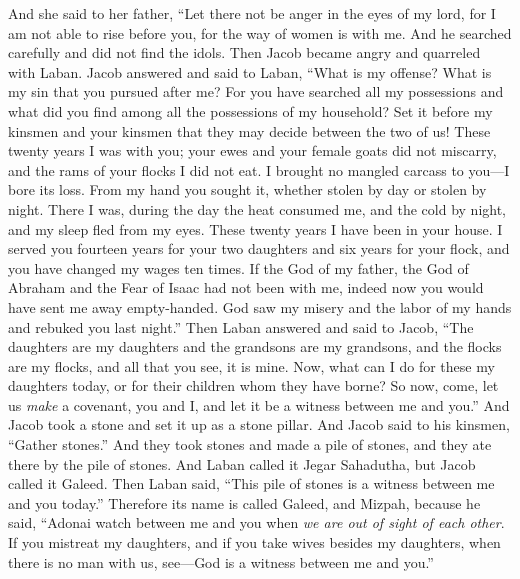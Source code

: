 \begin{biblechapter}
\verse And she said to her father, “Let there not be anger in the eyes of my lord, for I am not able to rise before you, for the way of women is with me. And he searched carefully and did not find the idols.
\verse Then Jacob became angry and quarreled with Laban. Jacob answered and said to Laban, “What is my offense? What is my sin that you pursued after me?
\verse For you have searched all my possessions and what did you find among all the possessions of my household? Set it before my kinsmen and your kinsmen that they may decide between the two of us!
\verse These twenty years I was with you; your ewes and your female goats did not miscarry, and the rams of your flocks I did not eat.
\verse I brought no mangled carcass to you—I bore its loss. From my hand you sought it, whether stolen by day or stolen by night.
\verse There I was, during the day the heat consumed me, and the cold by night, and my sleep fled from my eyes.
\verse These twenty years I have been in your house. I served you fourteen years for your two daughters and six years for your flock, and you have changed my wages ten times.
\verse If the God of my father, the God of Abraham and the Fear of Isaac had not been with me, indeed now you would have sent me away empty-handed. God saw my misery and the labor of my hands and rebuked you last night.”
\verse Then Laban answered and said to Jacob, “The daughters are my daughters and the grandsons are my grandsons, and the flocks are my flocks, and all that you see, it is mine. Now, what can I do for these my daughters today, or for their children whom they have borne?
\verse So now, come, let us \textit{make} a covenant, you and I, and let it be a witness between me and you.”
\verse And Jacob took a stone and set it up as a stone pillar.
\verse And Jacob said to his kinsmen, “Gather stones.” And they took stones and made a pile of stones, and they ate there by the pile of stones.
\verse And Laban called it Jegar Sahadutha, but Jacob called it Galeed.
\verse Then Laban said, “This pile of stones is a witness between me and you today.” Therefore its name is called Galeed,
\verse and Mizpah, because he said, “Adonai watch between me and you when \textit{we are out of sight of each other}.
\verse If you mistreat my daughters, and if you take wives besides my daughters, when there is no man with us, see—God is a witness between me and you.”

\end{biblechapter}
